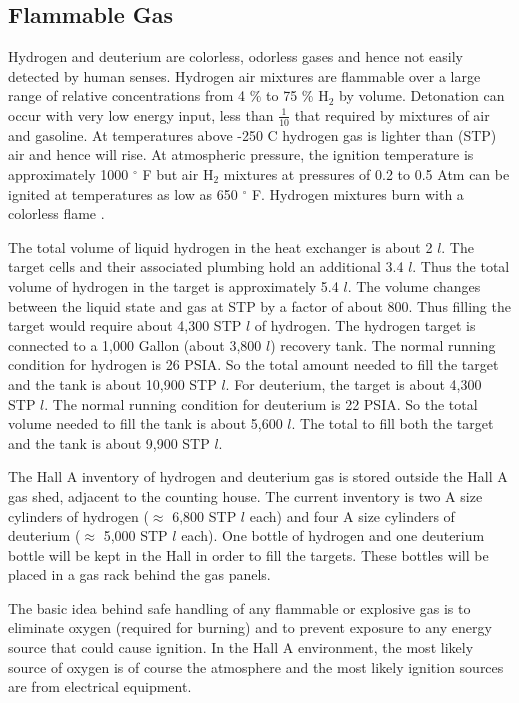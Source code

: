 \begin{safetyen}{10}{5}
\subsection{Flammable Gas}
\label{sec:targ-flammablegas}

Hydrogen and deuterium are
colorless, odorless gases and hence not easily detected by human senses.
Hydrogen air mixtures are flammable over a large range of relative
concentrations from 4 $\%$ to 75 $\%$ H$_2$ by volume. Detonation
can occur with very low energy input, less than $\frac{1}{10}$
that required by mixtures of air and gasoline. At temperatures above
-250 C hydrogen gas is lighter than (STP) air and hence will rise.
At atmospheric pressure, the ignition temperature is approximately
1000 $^\circ$ F but air H$_2$ mixtures at pressures of 0.2 to 0.5 Atm can be
ignited at temperatures as low as 650 $^\circ$ F. Hydrogen mixtures
burn with a colorless flame \cite{bi:mc75}.

The total volume of liquid hydrogen in the heat exchanger is about
2 $l$. The target cells and their associated plumbing hold
an additional 3.4 $l$. Thus the total volume of hydrogen
in the target is approximately 5.4 $l$. The volume changes between
the liquid state and gas at STP by a factor of about 800.
Thus filling the target
would require about 4,300 STP $l$ of hydrogen. The hydrogen target is 
connected to a 1,000 Gallon (about 3,800 $l$) recovery tank. The normal 
running condition for hydrogen is 26 PSIA. So the total amount needed
to fill the target and the tank is about 10,900 STP $l$. 
For deuterium, the target is about 4,300 STP $l$. The normal running
condition for deuterium is 22 PSIA. So the total volume needed
to fill the tank is about 5,600 $l$.
The total to fill both the target and the tank is 
about 9,900 STP $l$.

The Hall A inventory of hydrogen and deuterium gas is stored
outside the Hall A gas shed, adjacent to the counting house.
The current inventory is two A size cylinders of hydrogen
($\approx$ 6,800 STP $l$ each) and four A size cylinders
of deuterium ($\approx$ 5,000 STP $l$ each). 
One bottle of hydrogen and one deuterium bottle will be kept in the Hall
in order to fill the targets. These bottles will be placed in a gas rack behind
the gas panels. 

The basic idea behind safe handling of any flammable or explosive gas
is to eliminate oxygen (required for burning)
and to prevent exposure to any energy source that could cause ignition.
In the Hall A environment, the most likely source of oxygen is of course the
atmosphere and the most likely ignition sources are from electrical equipment.


\end{safetyen}
